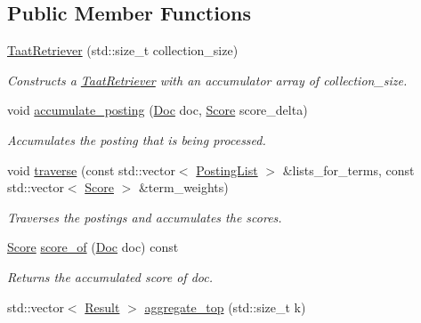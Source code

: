 \subsection*{Public Member Functions}
\begin{DoxyCompactItemize}
\item 
\hyperlink{classbloodhound_1_1query_1_1TaatRetriever_af443da08f4200fb84a3481d47bc4ac35}{Taat\+Retriever} (std\+::size\+\_\+t collection\+\_\+size)
\begin{DoxyCompactList}\small\item\em Constructs a \hyperlink{classbloodhound_1_1query_1_1TaatRetriever}{Taat\+Retriever} with an accumulator array of collection\+\_\+size. \end{DoxyCompactList}\item 
void \hyperlink{classbloodhound_1_1query_1_1TaatRetriever_aa9812dfbf0f5ec7fc7668abe22774929}{accumulate\+\_\+posting} (\hyperlink{structbloodhound_1_1Doc}{Doc} doc, \hyperlink{structbloodhound_1_1Score}{Score} score\+\_\+delta)
\begin{DoxyCompactList}\small\item\em Accumulates the posting that is being processed. \end{DoxyCompactList}\item 
void \hyperlink{classbloodhound_1_1query_1_1TaatRetriever_a1b476e4ada85862cb79a92b6424d2aa2}{traverse} (const std\+::vector$<$ \hyperlink{classbloodhound_1_1PostingList}{Posting\+List} $>$ \&lists\+\_\+for\+\_\+terms, const std\+::vector$<$ \hyperlink{structbloodhound_1_1Score}{Score} $>$ \&term\+\_\+weights)
\begin{DoxyCompactList}\small\item\em Traverses the postings and accumulates the scores. \end{DoxyCompactList}\item 
\hyperlink{structbloodhound_1_1Score}{Score} \hyperlink{classbloodhound_1_1query_1_1TaatRetriever_ae1c8d9643ca85ba7dba32325538e30b5}{score\+\_\+of} (\hyperlink{structbloodhound_1_1Doc}{Doc} doc) const
\begin{DoxyCompactList}\small\item\em Returns the accumulated score of doc. \end{DoxyCompactList}\item 
std\+::vector$<$ \hyperlink{structbloodhound_1_1query_1_1Result}{Result} $>$ \hyperlink{classbloodhound_1_1query_1_1TaatRetriever_a7f631f87075249c768873d15a59956c5}{aggregate\+\_\+top} (std\+::size\+\_\+t k)
\item 

\end{DoxyCompactItemize}
